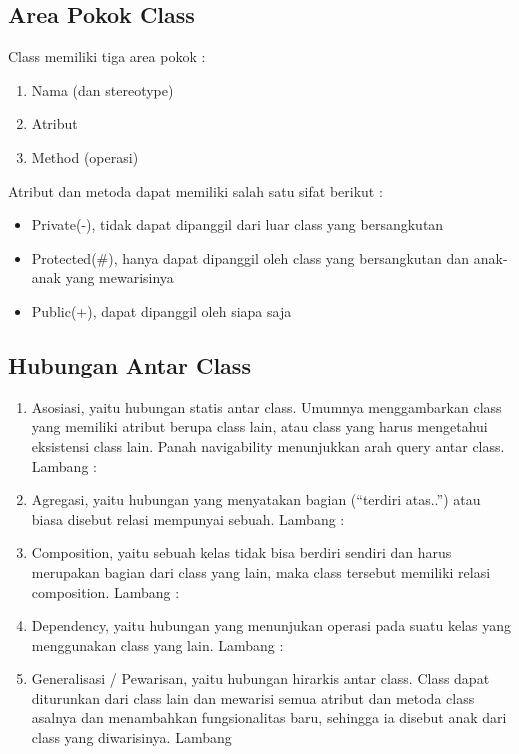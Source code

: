 \subsection{Area Pokok Class}
Class memiliki tiga area pokok :
\begin{enumerate}
\item
Nama (dan stereotype)
\item
Atribut
\item
Method (operasi)
\end{enumerate}
Atribut dan metoda dapat memiliki salah satu sifat berikut :
\begin{itemize}
\item
Private(-), tidak dapat dipanggil dari luar class yang bersangkutan
\item
Protected(\#), hanya dapat dipanggil oleh class yang bersangkutan dan anak-anak yang
mewarisinya
\item
Public(+), dapat dipanggil oleh siapa saja
\end{itemize}

\subsection{Hubungan Antar Class}
\begin{enumerate}
\item
Asosiasi, yaitu hubungan statis antar class. Umumnya menggambarkan class yang
memiliki atribut berupa class lain, atau class yang harus mengetahui eksistensi
class lain. Panah navigability menunjukkan arah query antar class.
Lambang :
\item
Agregasi, yaitu hubungan yang menyatakan bagian (“terdiri atas..”) atau biasa
disebut relasi mempunyai sebuah.
Lambang :
\item
Composition, yaitu sebuah kelas tidak bisa berdiri sendiri dan harus merupakan
bagian dari class yang lain, maka class tersebut memiliki relasi composition.
Lambang :
\item
Dependency, yaitu hubungan yang menunjukan operasi pada suatu kelas yang
menggunakan class yang lain.
Lambang :
\item
Generalisasi / Pewarisan, yaitu hubungan hirarkis antar class. Class dapat
diturunkan dari class lain dan mewarisi semua atribut dan metoda class asalnya
dan menambahkan fungsionalitas baru, sehingga ia disebut anak dari class yang
diwarisinya.
Lambang
\end{enumerate}




